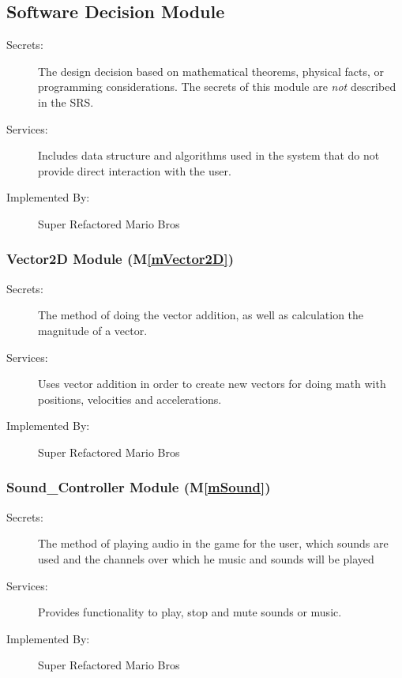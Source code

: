 \documentclass[12pt, titlepage]{article}
\newcommand{\mref}[1]{M\ref{#1}}
\begin{document}
\subsection{Software Decision Module}

\begin{description}
\item[Secrets:] The design decision based on mathematical theorems, physical
  facts, or programming considerations. The secrets of this module are
  \emph{not} described in the SRS.
\item[Services:] Includes data structure and algorithms used in the system that
  do not provide direct interaction with the user. 
\item[Implemented By:] Super Refactored Mario Bros
\end{description}

\subsubsection{Vector2D Module (\mref{mVector2D})}

\begin{description}
\item[Secrets:] The method of doing the vector addition, as well as calculation the magnitude of a vector.
\item[Services:] Uses vector addition in order to create new vectors for doing math with positions, velocities and accelerations. 
\item[Implemented By:] Super Refactored Mario Bros
\end{description}

\subsubsection{Sound\_Controller Module (\mref{mSound})}

\begin{description}
\item[Secrets:] The method of playing audio in the game for the user, which sounds are used and the channels over which he music and sounds will be played
\item[Services:] Provides functionality to play, stop and mute sounds or music.
\item[Implemented By:] Super Refactored Mario Bros
\end{description}
\end{document}
